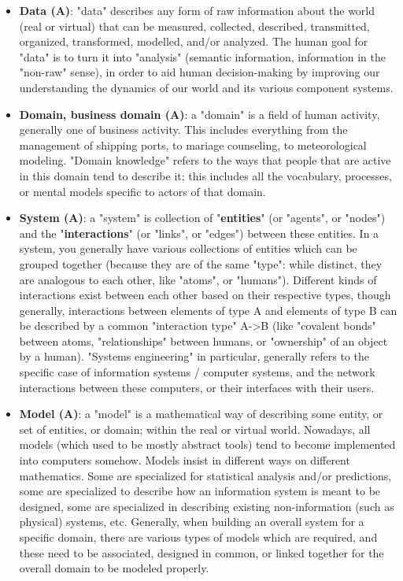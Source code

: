 \documentclass{article}
\begin{document}
\begin{itemize}
	\item \textbf{Data (A)}: "data" describes any form of raw information about the world (real or virtual) that can be measured, collected, described, transmitted, organized, transformed, modelled, and/or analyzed. The human goal for "data" is to turn it into "analysis" (semantic information, information in the "non-raw" sense), in order to aid human decision-making by improving our understanding the dynamics of our world and its various component systems.

	\item \textbf{Domain, business domain (A)}: a "domain" is a field of human activity, generally one of business activity. This includes everything from the management of shipping ports, to mariage counseling, to meteorological modeling. "Domain knowledge" refers to the ways that people that are active in this domain tend to describe it; this includes all the vocabulary, processes, or mental models specific to actors of that domain.

	\item \textbf{System (A)}: a "system" is collection of "\textbf{entities}" (or "agents", or "nodes") and the "\textbf{interactions}" (or "links", or "edges") between these entities. In a system, you generally have various collections of entities which can be grouped together (because they are of the same "type": while distinct, they are analogous to each other, like "atoms", or "humans"). Different kinds of interactions exist between each other based on their respective types, though generally, interactions between elements of type A and elements of type B can be described by a common "interaction type" A->B (like "covalent bonds" between atoms, "relationships" between humans, or "ownership" of an object by a human). "Systems engineering" in particular, generally refers to the specific case of information systems / computer systems, and the network interactions between these computers, or their interfaces with their users.

	\item \textbf{Model (A)}: a "model" is a mathematical way of describing some entity, or set of entities, or domain; within the real or virtual world. Nowadays, all models (which used to be mostly abstract tools) tend to become implemented into computers somehow. Models insist in different ways on different mathematics. Some are specialized for statistical analysis and/or predictions, some are specialized to describe how an information system is meant to be designed, some are specialized in describing existing non-information (such as physical) systems, etc. Generally, when building an overall system for a specific domain, there are various types of models which are required, and these need to be associated, designed in common, or linked together for the overall domain to be modeled properly.


\end{itemize}
\end{document}
